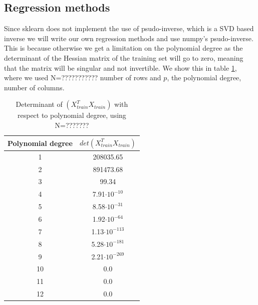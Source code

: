   




\subsection{Regression methods}
Since sklearn does not implement the use of psudo-inverse, which is a SVD based inverse we will write our own regression methods and use numpy's psudo-inverse. This is because otherwise we get a limitation on the polynomial degree as the determinant of the Hessian matrix of the training set will go to zero, meaning that the matrix will be singular and not invertible. We show this in table \ref{tab:determinants}, where we used N=??????????? number of rows and $p$, the polynomial degree, number of columns.

\begin{table}
    \centering
    \caption{Determinant of $(X^T_{train}X_{train})$ with respect to polynomial
    degree, using N=???????}
    \begin{tabular}{|c|c|}
        \hline
        Polynomial degree & $det(X_{train}^T X_{train})$  \\
        \hline
        1 & 208035.65\\
        \hline
        2 & 891473.68\\
        \hline
        3 & 99.34\\
        \hline
        4 & 7.91$\cdot10^{-10}$ \\
        \hline
        5 & 8.58$\cdot10^{-31}$ \\
        \hline
        6 & 1.92$\cdot10^{-64}$ \\
        \hline
        7 & 1.13$\cdot10^{-113}$ \\
        \hline
        8 & 5.28$\cdot10^{-181}$ \\
        \hline
        9 & 2.21$\cdot10^{-269}$ \\
        \hline
        10 & 0.0 \\
        \hline
        11 & 0.0 \\
        \hline
        12 & 0.0 \\
        \hline
    \end{tabular}\label{tab:determinants}
\end{table}


